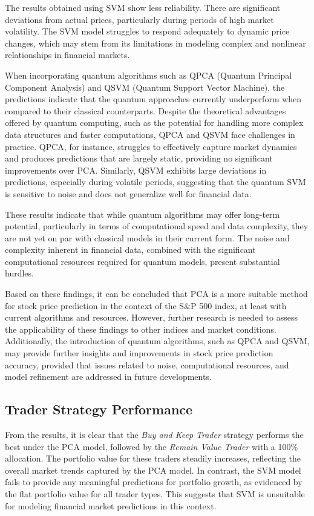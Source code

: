 \documentclass[journal]{IEEEtran}
\begin{document}
The results obtained using SVM show less reliability. There are significant deviations from actual prices, particularly during periods of high market volatility. The SVM model struggles to respond adequately to dynamic price changes, which may stem from its limitations in modeling complex and nonlinear relationships in financial markets.

When incorporating quantum algorithms such as QPCA (Quantum Principal Component Analysis) and QSVM (Quantum Support Vector Machine), the predictions indicate that the quantum approaches currently underperform when compared to their classical counterparts. Despite the theoretical advantages offered by quantum computing, such as the potential for handling more complex data structures and faster computations, QPCA and QSVM face challenges in practice. QPCA, for instance, struggles to effectively capture market dynamics and produces predictions that are largely static, providing no significant improvements over PCA. Similarly, QSVM exhibits large deviations in predictions, especially during volatile periods, suggesting that the quantum SVM is sensitive to noise and does not generalize well for financial data.

These results indicate that while quantum algorithms may offer long-term potential, particularly in terms of computational speed and data complexity, they are not yet on par with classical models in their current form. The noise and complexity inherent in financial data, combined with the significant computational resources required for quantum models, present substantial hurdles.

Based on these findings, it can be concluded that PCA is a more suitable method for stock price prediction in the context of the S\&P 500 index, at least with current algorithms and resources. However, further research is needed to assess the applicability of these findings to other indices and market conditions. Additionally, the introduction of quantum algorithms, such as QPCA and QSVM, may provide further insights and improvements in stock price prediction accuracy, provided that issues related to noise, computational resources, and model refinement are addressed in future developments.

\subsection{Trader Strategy Performance}

From the results, it is clear that the \textit{Buy and Keep Trader} strategy performs the best under the PCA model, followed by the \textit{Remain Value Trader} with a 100\% allocation. The portfolio value for these traders steadily increases, reflecting the overall market trends captured by the PCA model. In contrast, the SVM model fails to provide any meaningful predictions for portfolio growth, as evidenced by the flat portfolio value for all trader types. This suggests that SVM is unsuitable for modeling financial market predictions in this context.
\end{document}
